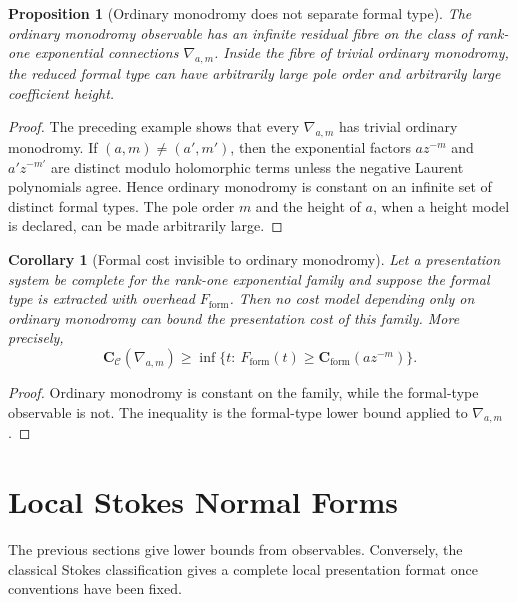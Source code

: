 \documentclass[11pt]{article}
\newtheorem{proposition}[theorem]{Proposition}
\newtheorem{corollary}[theorem]{Corollary}
\begin{document}
\begin{proposition}[Ordinary monodromy does not separate formal type]
The ordinary monodromy observable has an infinite residual fibre on the class of rank-one exponential connections \(\nabla_{a,m}\).  Inside the fibre of trivial ordinary monodromy, the reduced formal type can have arbitrarily large pole order and arbitrarily large coefficient height.
\end{proposition}

\begin{proof}
The preceding example shows that every \(\nabla_{a,m}\) has trivial ordinary monodromy.  If \((a,m)\ne(a',m')\), then the exponential factors \(a z^{-m}\) and \(a' z^{-m'}\) are distinct modulo holomorphic terms unless the negative Laurent polynomials agree.  Hence ordinary monodromy is constant on an infinite set of distinct formal types.  The pole order \(m\) and the height of \(a\), when a height model is declared, can be made arbitrarily large.
\end{proof}

\begin{corollary}[Formal cost invisible to ordinary monodromy]
Let a presentation system be complete for the rank-one exponential family and suppose the formal type is extracted with overhead \(F_{\operatorname{form}}\).  Then no cost model depending only on ordinary monodromy can bound the presentation cost of this family.  More precisely,
\[
\mathbf C_{\mathcal C}(\nabla_{a,m})
\ge
\inf\{t:\ F_{\operatorname{form}}(t)\ge
\mathbf C_{\operatorname{form}}(a z^{-m})\}.
\]
\end{corollary}

\begin{proof}
Ordinary monodromy is constant on the family, while the formal-type observable is not.  The inequality is the formal-type lower bound applied to \(\nabla_{a,m}\).
\end{proof}

\section{Local Stokes Normal Forms}

The previous sections give lower bounds from observables.  Conversely, the classical Stokes classification gives a complete local presentation format once conventions have been fixed.
\end{document}
